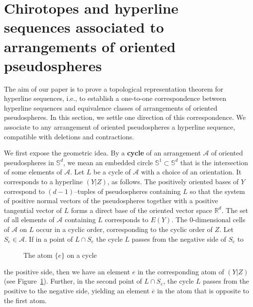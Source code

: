 \documentclass[a4paper]{amsart}
\newcommand{\begriff}[1]{\textbf{#1}}
\newcommand{\p}{\mathbb S}
\theoremstyle{definition}
\theoremstyle{remark}
\begin{document}


\section{Chirotopes and hyperline sequences associated to arrangements
  of oriented pseudospheres} 
\label{sec:X(A)}

The aim of our paper is to prove a topological representation theorem
for hyperline sequences, i.e., to establish a one-to-one correspondence
between hyperline sequences and equivalence classes of arrangements of
oriented pseudospheres.
In this  section, we settle one direction of this correspondence. We
associate to any arrangement of oriented pseudospheres a 
hyperline sequence, compatible with deletions and contractions.

We first expose the geometric idea.
By a \begriff{cycle} of an arrangement $\mathcal A$ of oriented
pseudo\-spheres in $\p^d$, we mean an embedded  circle 
$\mathbb S^1\subset \p^d$ that is the intersection of some
elements of $\mathcal A$. 
Let $L$ be a cycle of $\mathcal A$ with a choice of an orientation. It
corresponds to a hyperline $(Y|Z)$, as follows. The positively oriented
bases of $Y$ correspond to 
$(d-1)$--tuples of pseudospheres containing $L$ so that the system of
positive normal vectors of the pseudospheres together with a positive
tangential vector of $L$ forms a direct base of the oriented vector
space $\mathbb R^d$. 
The set of all elements of $\mathcal A$ containing $L$
corresponds to $E(Y)$. 
The $0$-dimensional cells of $\mathcal A$ on $L$
occur in a cyclic order, corresponding to the cyclic order of $Z$. 
%
Let $S_e\in \mathcal A$. If in a point of $L\cap S_e$ the
cycle $L$ passes from the negative side of $S_e$ to 
\begin{figure}[htbp]
  \begin{center}
    \caption{The atom $\{ e\}$ on a cycle}
    \label{fig:positivevertex}
  \end{center}
\end{figure}
the positive side, then we have an element $ e$ in the corresponding
atom of $(Y|Z)$ (see Figure~\ref{fig:positivevertex}). Further, in
the second point of $L\cap S_e$, the cycle $L$ passes from the positive
to the negative side,  yielding an element $\overline{ e}$ in the
atom that is opposite to the first atom.  
%
\end{document}
